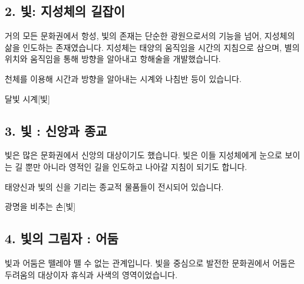 \documentclass{report}
\begin{document}
	\subsection*{2. 빛: 지성체의 길잡이}
	{\storyfont\Large 거의 모든 문화권에서 항성, 빛의 존재는 단순한 광원으로서의 기능을 넘어, 지성체의 삶을 인도하는 존재였습니다. 지성체는 태양의 움직임을 시간의 지침으로 삼으며, 별의 위치와 움직임을 통해 방향을 알아내고 항해술을 개발했습니다.}
	
	천체를 이용해 시간과 방향을 알아내는 시계와 나침반 등이 있습니다.
	
	\begin{story}{달빛 시계}{[빛]}
	\end{story}
	
	\subsection*{3. 빛 : 신앙과 종교}
	{\storyfont\Large 빛은 많은 문화권에서 신앙의 대상이기도 했습니다. 빛은 이들 지성체에게 눈으로 보이는 길 뿐만 아니라 영적인 길을 인도하고 나아갈 지침이 되기도 합니다.}
	
	태양신과 빛의 신을 기리는 종교적 물품들이 전시되어 있습니다.
	
	\begin{story}{광명을 비추는 손}{[빛]}
	\end{story}
	
	\subsection*{4. 빛의 그림자 : 어둠}
	{\storyfont\Large 빛과 어둠은 뗄레야 뗄 수 없는 관계입니다. 빛을 중심으로 발전한 문화권에서 어둠은 두려움의 대상이자 휴식과 사색의 영역이었습니다.}
	
\end{document}
